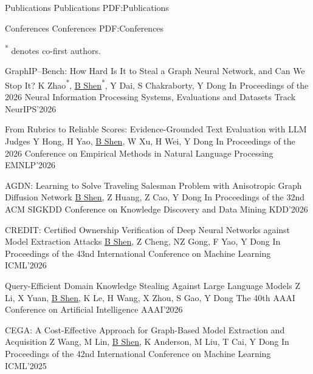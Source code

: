 \Section
{Publications}
{Publications}
{PDF:Publications}


\BigGap
\SubSection
{Conferences}
{Conferences}
{PDF:Conferences}

{\small \noindent\textsuperscript{*} denotes co-first authors.\par}

\begingroup
\renewcommand{\MaxNumberedItem}{[99]}

\BigGap
\NumberedItem{[10]}
{\PaperEntry
    {GraphIP–Bench: How Hard Is It to Steal a Graph Neural Network, and Can We Stop It?}
    {K Zhao\textsuperscript{*}, \underline{B Shen}\textsuperscript{*}, Y Dai, S Chakraborty, Y Dong}
    {In Proceedings of the 2026 Neural Information Processing Systems, Evaluations and Datasets Track}
    {NeurIPS'2026}
    {}
}

\BigGap
\NumberedItem{[9]}
{\PaperEntry
    {From Rubrics to Reliable Scores: Evidence-Grounded Text Evaluation with LLM Judges}
    {Y Hong, H Yao, \underline{B Shen}, W Xu, H Wei, Y Dong}
    {In Proceedings of the 2026 Conference on Empirical Methods in Natural Language Processing}
    {EMNLP'2026}
    {}
}

\BigGap
\NumberedItem{[8]}
{\PaperEntry
    {AGDN: Learning to Solve Traveling Salesman Problem with Anisotropic Graph Diffusion Network}
    {\underline{B Shen}, Z Huang, Z Cao, Y Dong}
    {In Proceedings of the 32nd ACM SIGKDD Conference on Knowledge Discovery and Data Mining}
    {KDD'2026}
    {}
}

\BigGap
\NumberedItem{[7]}
{\PaperEntry
    {CREDIT: Certified Ownership Verification of Deep Neural Networks against Model Extraction Attacks}
    {\underline{B Shen}, Z Cheng, NZ Gong, F Yao, Y Dong}
    {In Proceedings of the 43nd International Conference on Machine Learning}
    {ICML'2026}
    {}
}

\BigGap
\NumberedItem{[6]}
{\PaperEntry
    {Query-Efficient Domain Knowledge Stealing Against Large Language Models}
    {Z Li, X Yuan, \underline{B Shen}, K Le, H Wang, X Zhou, S Gao, Y Dong }
    {The 40th AAAI Conference on Artificial Intelligence}
    {AAAI'2026}
    {}
}

\BigGap
\NumberedItem{[5]}
{\PaperEntry
    {CEGA: A Cost-Effective Approach for Graph-Based Model Extraction and Acquisition}
    {Z Wang, M Lin, \underline{B Shen}, K Anderson, M Liu, T Cai, Y Dong}
    {In Proceedings of the 42nd International Conference on Machine Learning}
    {ICML'2025}
    {}
}

